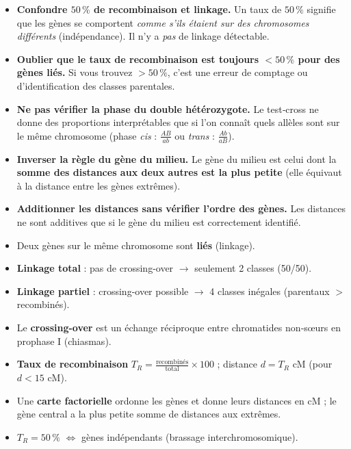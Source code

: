\documentclass[11pt]{article}
\begin{document}
\begin{attention}
\begin{itemize}
\item \textbf{Confondre $50\,\%$ de recombinaison et linkage.} Un taux de $50\,\%$ signifie que les gènes se comportent \emph{comme s’ils étaient sur des chromosomes différents} (indépendance). Il n’y a \emph{pas} de linkage détectable.
\item \textbf{Oublier que le taux de recombinaison est toujours $< 50\,\%$ pour des gènes liés.} Si vous trouvez $> 50\,\%$, c’est une erreur de comptage ou d’identification des classes parentales.
\item \textbf{Ne pas vérifier la phase du double hétérozygote.} Le test‑cross ne donne des proportions interprétables que si l’on connaît quels allèles sont sur le même chromosome (phase \emph{cis} : $\frac{AB}{ab}$ ou \emph{trans} : $\frac{Ab}{aB}$).
\item \textbf{Inverser la règle du gène du milieu.} Le gène du milieu est celui dont la \textbf{somme des distances aux deux autres est la plus petite} (elle équivaut à la distance entre les gènes extrêmes).
\item \textbf{Additionner les distances sans vérifier l’ordre des gènes.} Les distances ne sont additives que si le gène du milieu est correctement identifié.
\end{itemize}
\end{attention}

\begin{aretenir}
\begin{itemize}
\item Deux gènes sur le même chromosome sont \textbf{liés} (linkage).
\item \textbf{Linkage total} : pas de crossing-over $\rightarrow$ seulement 2 classes (50/50).
\item \textbf{Linkage partiel} : crossing-over possible $\rightarrow$ 4 classes inégales (parentaux $>$ recombinés).
\item Le \textbf{crossing-over} est un échange réciproque entre chromatides non‑sœurs en prophase I (chiasmas).
\item \textbf{Taux de recombinaison} $T_R = \frac{\text{recombinés}}{\text{total}}\times 100$ ; distance $d = T_R$ cM (pour $d < 15$ cM).
\item Une \textbf{carte factorielle} ordonne les gènes et donne leurs distances en cM ; le gène central a la plus petite somme de distances aux extrêmes.
\item $T_R = 50\,\%$ $\Leftrightarrow$ gènes indépendants (brassage interchromosomique).
\end{itemize}
\end{aretenir}
\end{document}

